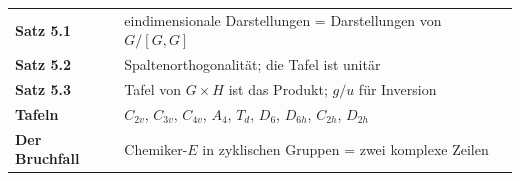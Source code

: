\begin{merksatz}
\begin{center}
\renewcommand{\arraystretch}{1.5}
\begin{tabular}{@{}P{3.0cm}P{5.6cm}@{}}
\toprule
\textbf{Satz 5.1} & eindimensionale Darstellungen = Darstellungen von $G/[G, G]$\\
\textbf{Satz 5.2} & Spaltenorthogonalität; die Tafel ist unitär\\
\textbf{Satz 5.3} & Tafel von $G\times H$ ist das Produkt; $g/u$ für Inversion\\
\textbf{Tafeln} & $C_{2v}$, $C_{3v}$, $C_{4v}$, $A_4$, $T_d$, $D_6$, $D_{6h}$, $C_{2h}$, $D_{2h}$\\
\textbf{Der Bruchfall} & Chemiker-$E$ in zyklischen Gruppen = zwei komplexe Zeilen\\
\bottomrule
\end{tabular}
\end{center}

\begin{center}
\begin{minipage}{0.88\textwidth}
\end{minipage}
\end{center}
\end{merksatz}
